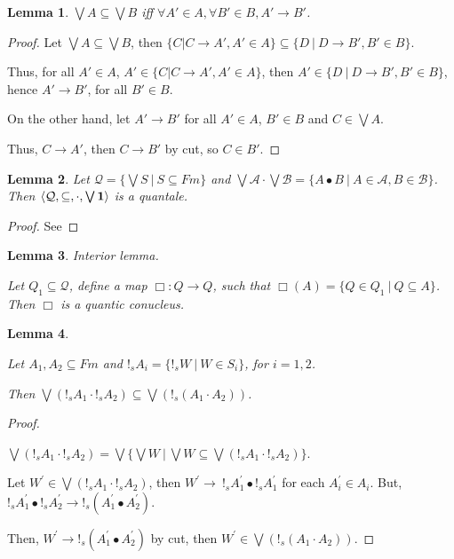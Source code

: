 \documentclass[a4paper]{article}
\newtheorem{lemma}{Lemma}
\begin{document}
\begin{lemma}
  $\bigvee A \subseteq \bigvee B$ iff $\forall A' \in A, \forall B' \in B, A' \rightarrow B'$.
\end{lemma}

\begin{proof}
  Let $\bigvee A \subseteq \bigvee B$,
  then $\{ C | C \rightarrow A', A' \in A \} \subseteq \{ D \: | \: D \rightarrow B', B' \in B \}$.

Thus, for all $A' \in A$, $A' \in \{ C | C \rightarrow A', A' \in A \}$,
then $A' \in \{ D \: | \: D \rightarrow B', B' \in B \}$, hence $A' \rightarrow B'$, for all $B' \in B$.

On the other hand, let $A' \rightarrow B'$ for all $A' \in A$, $B' \in B$ and $C \in \bigvee A$.

Thus, $C \rightarrow A'$, then $C \rightarrow B'$ by cut, so $C \in B'$.

\end{proof}

\begin{lemma}
  Let $\mathcal{Q} = \{ \bigvee S \: | \: S \subseteq Fm \}$ and $\bigvee \mathcal{A} \cdot \bigvee \mathcal{B} =
  \{ A \bullet B \: | \: A \in \mathcal{A}, B \in \mathcal{B} \}$.
  Then $\langle \mathcal{Q}, \subseteq, \cdot, \bigvee{{\bf 1}}\rangle$ is a quantale.
\end{lemma}

\begin{proof}
  See
\end{proof}

\begin{lemma} Interior lemma.
$ $

Let $Q_1 \subseteq \mathcal{Q}$, define a map $\Box : Q \to Q$, such that $\Box(A) = \{  Q \in Q_1 \: | \: Q \subseteq A \}$.
Then $\Box$ is a quantic conucleus.
\end{lemma}

\begin{lemma}
$ $

  Let $A_1, A_2 \subseteq Fm$ and $!_s A_i = \{ !_s W \: | \: W \in S_i \}$, for $i = 1,2$.

  Then $\bigvee (!_s A_1 \cdot !_s A_2) \subseteq \bigvee (!_s (A_1 \cdot A_2))$.
\end{lemma}

\begin{proof}
$ $

$\bigvee (!_s A_1 \cdot !_s A_2) = \bigvee \{ \bigvee W \: | \: \bigvee W \subseteq \bigvee (!_s A_1 \cdot !_s A_2) \}$.

Let $W^{'} \in \bigvee (!_s A_1 \cdot !_s A_2)$,
then $W^{'} \rightarrow \: !_s A_1^{'} \bullet !_s A_1^{'}$ for each $A_i^{'} \in A_i$.
But, $!_s A_1^{'} \bullet !_s A_2^{'} \rightarrow !_s (A_1^{'} \bullet A_2^{'})$.

Then, $W^{'} \rightarrow !_s (A_1^{'} \bullet A_2^{'})$ by cut, then $W^{'} \in \bigvee (!_s (A_1 \cdot A_2))$.
\end{proof}
\end{document}
